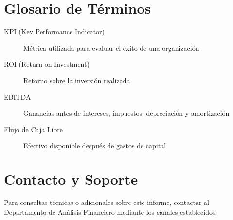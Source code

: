 \documentclass[11pt]{report}
\begin{document}
\section{Glosario de Términos}
\begin{description}
    \item[KPI (Key Performance Indicator)] Métrica utilizada para evaluar el éxito de una organización
    \item[ROI (Return on Investment)] Retorno sobre la inversión realizada
    \item[EBITDA] Ganancias antes de intereses, impuestos, depreciación y amortización
    \item[Flujo de Caja Libre] Efectivo disponible después de gastos de capital
\end{description}

\section{Contacto y Soporte}
Para consultas técnicas o adicionales sobre este informe, contactar al 
Departamento de Análisis Financiero mediante los canales establecidos.
\end{document}

